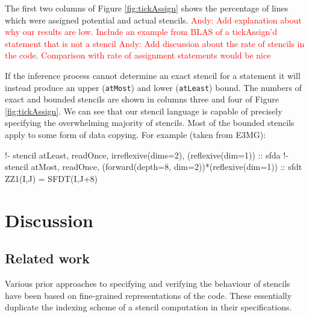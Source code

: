 \documentclass[9pt]{sigplanconf}
\newcommand{\anote}[1]{\textcolor{red}{Andy: #1}}
\theoremstyle{definition}
\newcommand{\term}[1]{\texttt{#1}}
\begin{document}
The first two columns of Figure \ref{fig:tickAssign} shows the percentage of lines which were
assigned potential and actual stencils.
\anote{Add explanation about why our results are low. Include an example from BLAS of a tickAssign'd statement that is not a stencil}
\anote{Add discussion about the rate of stencils in the code. Comparison with rate of assignment statements would be nice}

If the inference process cannot determine an exact stencil for a statement it will instead produce an upper (\term{atMost}) and lower (\term{atLeast}) bound. The numbers of exact and bounded stencils are shown in columns three and four of Figure \ref{fig:tickAssign}. We can see that our stencil language is capable of precisely specifying the overwhelming majority of stencils. Most of the bounded stencils apply to some form of data copying. For example (taken from E3MG):
\begin{ExmVerbatim}
!- stencil atLeast, readOnce, irreflexive(dims=2), (reflexive(dim=1)) :: sfda
!- stencil atMost, readOnce, (forward(depth=8, dim=2))*(reflexive(dim=1)) :: sfdt
ZZ1(I,J) = SFDT(I,J+8)
\end{ExmVerbatim}




\section{Discussion}
\label{sec:discussion}

\subsection{Related work}

Various prior approaches to specifying and verifying the behaviour
of stencils have been based on fine-grained representations of the
code. These essentially duplicate the indexing scheme of a stencil
computation in their specifications. 
 
\end{document}

